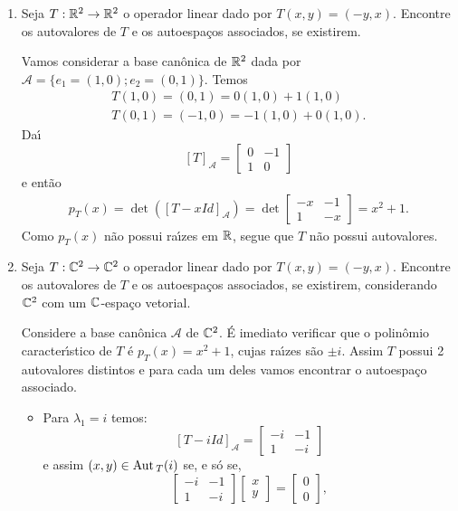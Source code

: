 \begin{exemplo}
	\begin{enumerate}
		\item Seja $T : \mathbb{R}^2 \to \mathbb{R}^2$ o operador linear dado por $T(x,y) = (-y,x)$. Encontre os autovalores de $T$ e os autoespa\c{c}os associados, se existirem.
		\begin{solucao}
			Vamos considerar a base can\^onica de $\mathbb{R}^2$ dada por $\mathcal{A} = \{e_1 = (1,0); e_2 = (0,1)\}$. Temos
			\begin{align}
				T(1,0) = (0,1) = 0(1,0) + 1(1,0)\\
				T(0,1) = (-1,0) = -1(1,0) + 0(1,0).
			\end{align}
			Da{\'\i}
			\[
				[T]_\mathcal{A} = \begin{bmatrix}0 & -1\\ 1 & 0\end{bmatrix}
			\]
			e ent\~ao
			\begin{align*}
				p_T(x) = \det([T - xId]_\mathcal{A}) = \det\begin{bmatrix} -x & -1\\1 & -x\end{bmatrix} = x^2 + 1.
			\end{align*}
			Como $p_T(x)$ n\~ao possui ra{\'\i}zes em $\mathbb{R}$, segue que $T$ n\~ao possui autovalores.
		\end{solucao}
		\item Seja $T : \mathbb{C}^2 \to \mathbb{C}^2$ o operador linear dado por $T(x,y) = (-y,x)$. Encontre os autovalores de $T$ e os autoespa\c{c}os associados, se existirem, considerando $\mathbb{C}^2$ com um $\mathbb{C}$-espa\c{c}o vetorial.
		\begin{solucao}
			Considere a base can\^onica $\mathcal{A}$ de $\mathbb{C}^2$. \'E imediato verificar que o polin\^omio caracter{\'\i}stico de $T$ \'e $p_T(x) = x^2 + 1$, cujas ra{\'\i}zes s\~ao $\pm i$. Assim $T$ possui 2 autovalores distintos e para cada um deles vamos encontrar o autoespa\c{c}o associado.
			\begin{itemize}
				\item Para $\lambda_1 = i$ temos:
				\[
					[T - iId]_\mathcal{A} = \begin{bmatrix} -i & -1\\1 & -i\end{bmatrix}
				\]
				e assim $(x,y) \in {\rm Aut\,}_T(i)$ se, e s\'o se,
				\[
					\begin{bmatrix} -i & -1\\1 & -i\end{bmatrix} \begin{bmatrix} x\\y\end{bmatrix}	 = \begin{bmatrix} 0\\0\end{bmatrix},
\]
\end{itemize}
\end{solucao}
\end{enumerate}
\end{exemplo}
